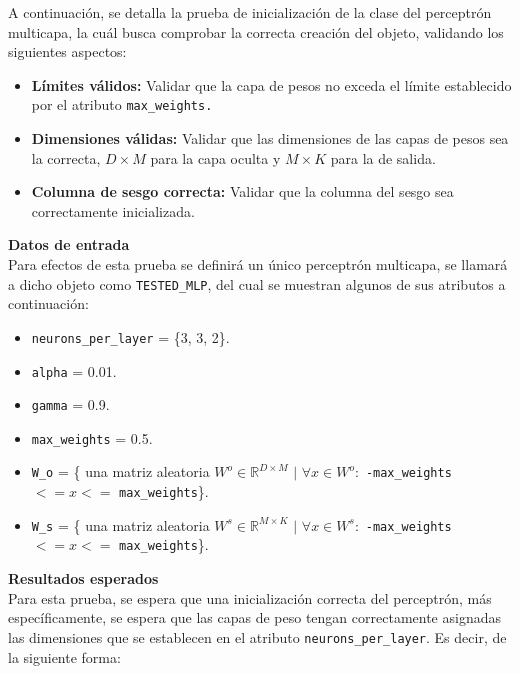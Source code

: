 \documentclass{article}
\begin{document}
A continuación, se detalla la prueba de inicialización de la clase del perceptrón multicapa, la cuál busca comprobar la correcta creación del objeto, validando los siguientes aspectos:

\begin{itemize}
    \item \textbf{Límites válidos:} Validar que la capa de pesos no exceda el límite establecido por el atributo \texttt{max\_weights.}

    \item \textbf{Dimensiones válidas:} Validar que las dimensiones de las capas de pesos sea la correcta, $D \times M$ para la capa oculta y $M \times K$ para la de salida.

    \item \textbf{Columna de sesgo correcta:} Validar que la columna del sesgo sea correctamente inicializada. \\
\end{itemize}

\noindent
\textbf{Datos de entrada}
\label{inputs}
\\
Para efectos de esta prueba se definirá un único perceptrón multicapa, se llamará a dicho objeto como \texttt{TESTED\_MLP}, del cual se muestran algunos de sus atributos a continuación:

\begin{itemize}
    \item \texttt{neurons\_per\_layer} = \{3, 3, 2\}.
    \item \texttt{alpha} = 0.01.
    \item \texttt{gamma} = 0.9.
    \item \texttt{max\_weights} = 0.5.
    
    \item \texttt{W\_o} = \{ una matriz aleatoria $W^{o}\in\mathbb{R}^{D \times M}$ $|$ $\forall x \in W^{o} :$ \texttt{-max\_weights} $<= x <=$ \texttt{max\_weights}\}.
    
    \item \texttt{W\_s} = \{ una matriz aleatoria $W^{s}\in\mathbb{R}^{M \times K}$ $|$ $\forall x \in W^{s} :$ \texttt{-max\_weights} $<= x <=$ \texttt{max\_weights}\}.    
\end{itemize}


\noindent
\textbf{Resultados esperados}
\\
Para esta prueba, se espera que una inicialización correcta del perceptrón, más específicamente, se espera que las capas de peso tengan correctamente asignadas las dimensiones que se establecen en el atributo \texttt{neurons\_per\_layer}. Es decir, de la siguiente forma:
\end{document}
